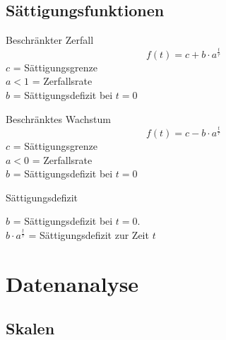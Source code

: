 \begin{multicols}{2}
\subsection{Sättigungsfunktionen}
\begin{gesetz}{Beschränkter Zerfall}{}
$$f(t) = c + b\cdot{}a^\frac{t}\tau$$
$c$ = Sättigungsgrenze\\
$a<1$ = Zerfallsrate\\
$b$ = Sättigungsdefizit bei $t=0$
\end{gesetz}

\begin{gesetz}{Beschränktes Wachstum}{}
$$f(t) = c - b\cdot{}a^\frac{t}\tau$$
$c$ = Sättigungsgrenze\\
$a<0$ = Zerfallsrate\\
$b$ = Sättigungsdefizit bei $t=0$
\end{gesetz}

\begin{bemerkung}{Sättigungsdefizit}{}

$b$ = Sättigungsdefizit bei $t=0$.\\
$b\cdot{}a^\frac{t}\tau$ = Sättigungsdefizit zur Zeit $t$
\end{bemerkung}

\end{multicols}

\hrulefill
\section{Datenanalyse}

\subsection{Skalen}






